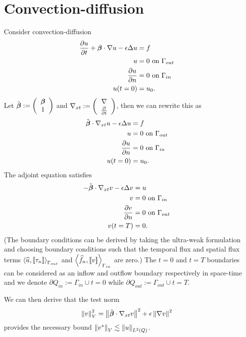 \documentclass{article}
\begin{document}
\section{Convection-diffusion}

Consider convection-diffusion
\begin{align*}
\frac{\partial u}{\partial t} + \boldsymbol\beta\cdot\nabla u - \epsilon \Delta u &= f\\
u &= 0 \text{ on } \Gamma_{out}\\
\frac{\partial u}{\partial n} &= 0 \text{ on } \Gamma_{in}\\
u(t=0) &= u_0.
\end{align*}
Let $\tilde{\boldsymbol\beta}:=\left( \begin{array}{c} \boldsymbol\beta\\ 1\\ \end{array} \right)$ and $\nabla_{xt}:=\left( \begin{array}{c} \nabla\\ \frac{\partial}{\partial t}\\ \end{array} \right)$, then we can rewrite this as
\begin{align*}
\tilde{\boldsymbol\beta}\cdot\nabla_{xt} u - \epsilon \Delta u &= f\\
u &= 0 \text{ on } \Gamma_{out}\\
\frac{\partial u}{\partial n} &= 0 \text{ on } \Gamma_{in}\\
u(t=0) &= u_0.
\end{align*}
The adjoint equation satisfies
\begin{align*}
-\tilde{\boldsymbol\beta}\cdot\nabla_{xt} v - \epsilon \Delta v &= u\\
v &= 0 \text{ on } \Gamma_{in}\\
\frac{\partial v}{\partial n} &= 0 \text{ on } \Gamma_{out}\\
v(t=T) &= 0.
\end{align*}
(The boundary conditions can be derived by taking the ultra-weak formulation and choosing boundary conditions such that the temporal flux and spatial flux terms $\left\langle \widehat{u}, \left[ \![\tau_n]\! \right] \right\rangle_{\Gamma_{out}}$ and $\left\langle \widehat{f}_n,\left[ \![v]\! \right] \right\rangle_{\Gamma_{in}}$ are zero.)
The $t=0$ and $t=T$ boundaries can be considered as an inflow and outflow boundary respectively in space-time 
and we denote $\partial Q_{in}:=\Gamma_{in}\cup t=0$ while $\partial Q_{out}:=\Gamma_{out}\cup t=T$.

We can then derive that the test norm
\[
\left\| v \right\|_V^2 = \left\| \tilde{\boldsymbol\beta}\cdot\nabla_{xt} v \right\|^2 + \epsilon\left\| \nabla v \right\|^2 
\]
provides the necessary bound $\left\| v^* \right\|_V \lesssim \left\| u \right\|_{L^2\left( Q \right)}$.
\end{document}
